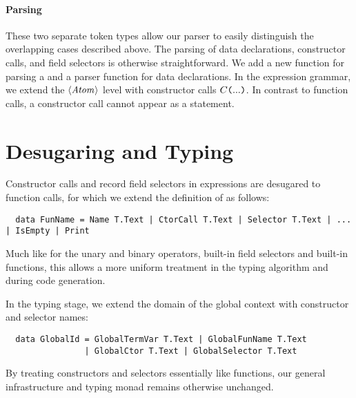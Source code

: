 \paragraph{Parsing}
These two separate token types allow our parser to easily distinguish the
overlapping cases described above.
The parsing of data declarations, constructor calls, and field selectors is
otherwise straightforward. We add a new function  for parsing a
 and a parser function for data declarations.
In the expression grammar, we extend the $\langle \textit{Atom}\kern.7pt \rangle$ level with constructor
calls $C\texttt{(}...\texttt{)}$. In contrast to function calls, a constructor
call cannot appear as a statement.


\section{Desugaring and Typing} \label{sec:ext-typing}

Constructor calls and record field selectors in expressions are desugared to
function calls, for which we extend the definition of  as
follows:
\begin{verbatim}
  data FunName = Name T.Text | CtorCall T.Text | Selector T.Text | ... | IsEmpty | Print
\end{verbatim}

Much like for the unary and binary operators, built-in field selectors and
built-in functions, this allows a more uniform treatment in the typing algorithm
and during code generation.

In the typing stage, we extend the domain of the global context with
constructor and selector names:
\begin{verbatim}
  data GlobalId = GlobalTermVar T.Text | GlobalFunName T.Text
                | GlobalCtor T.Text | GlobalSelector T.Text
\end{verbatim}
%
By treating constructors and selectors essentially like functions, our general
infrastructure and typing monad remains otherwise unchanged.

